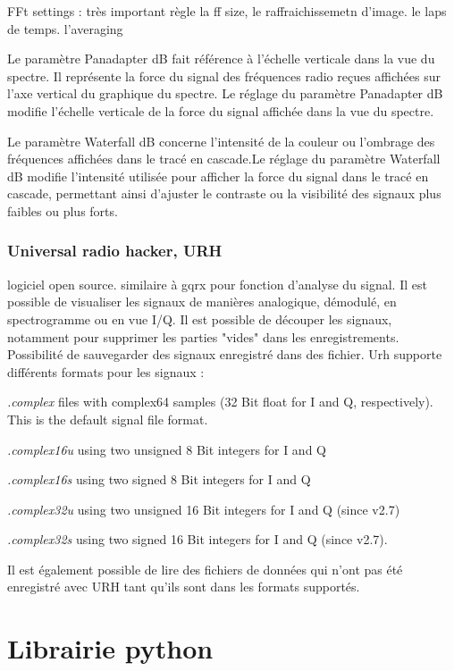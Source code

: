 FFt settings : très important règle la ff size, le raffraichissemetn d'image. le laps de temps. l'averaging

Le paramètre Panadapter dB fait référence à l'échelle verticale dans la vue du spectre. Il représente la force du signal des fréquences radio reçues affichées sur l'axe vertical du graphique du spectre. Le réglage du paramètre Panadapter dB modifie l’échelle verticale de la force du signal affichée dans la vue du spectre.

Le paramètre Waterfall dB concerne l'intensité de la couleur ou l'ombrage des fréquences affichées dans le tracé en cascade.Le réglage du paramètre Waterfall dB modifie l'intensité utilisée pour afficher la force du signal dans le tracé en cascade, permettant ainsi d'ajuster le contraste ou la visibilité des signaux plus faibles ou plus forts.


\subsubsection{Universal radio hacker, URH}

logiciel open source. similaire à gqrx pour fonction d'analyse du signal. Il est possible de visualiser les signaux de manières analogique, démodulé, en spectrogramme ou en vue I/Q. Il est possible de découper les signaux, notamment pour supprimer les parties "vides" dans les enregistrements. Possibilité de sauvegarder des signaux enregistré dans des fichier. Urh supporte différents formats pour les signaux :

 \textit{.complex} files with complex64 samples (32 Bit float for I and Q, respectively). This is the default signal file format.
 
\textit{.complex16u} using two unsigned 8 Bit integers for I and Q

\textit{.complex16s} using two signed 8 Bit integers for I and Q

\textit{.complex32u} using two unsigned 16 Bit integers for I and Q (since v2.7)

\textit{.complex32s} using two signed 16 Bit integers for I and Q (since v2.7).

Il est également possible de lire des fichiers de données qui n'ont pas été enregistré avec URH tant qu'ils sont dans les formats supportés.

\section{Librairie python}

